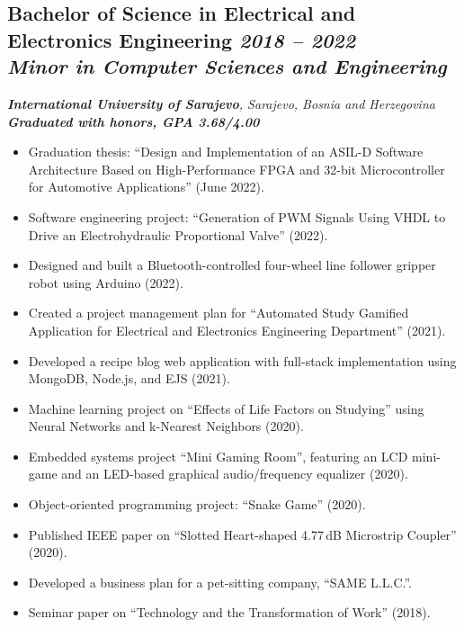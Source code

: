 \subsection*{\textbf{Bachelor of Science in Electrical and Electronics Engineering} \hfill \textit{2018 -- 2022}\\
\textit{Minor in Computer Sciences and Engineering}}  
\noindent\textit{\textbf{International University of Sarajevo}, Sarajevo, Bosnia and Herzegovina} \\  
\noindent\textit{\textbf{Graduated with honors, GPA 3.68/4.00}} 
\begin{itemize}[leftmargin=*,noitemsep,topsep=3pt]
    \item Graduation thesis: \enquote{Design and Implementation of an ASIL-D Software Architecture Based on High-Performance FPGA and 32-bit Microcontroller for Automotive Applications} (June 2022).
    \item Software engineering project: \enquote{Generation of PWM Signals Using VHDL to Drive an Electrohydraulic Proportional Valve} (2022).
    \item Designed and built a Bluetooth-controlled four-wheel line follower gripper robot using Arduino (2022).
    \item Created a project management plan for \enquote{Automated Study Gamified Application for Electrical and Electronics Engineering Department} (2021).
    \item Developed a recipe blog web application with full-stack implementation using MongoDB, Node.js, and EJS (2021).
    \item Machine learning project on \enquote{Effects of Life Factors on Studying} using Neural Networks and k-Nearest Neighbors (2020).
    \item Embedded systems project \enquote{Mini Gaming Room}, featuring an LCD mini-game and an LED-based graphical audio/frequency equalizer (2020).
    \item Object-oriented programming project: \enquote{Snake Game} (2020).
    \item Published IEEE paper on \enquote{Slotted Heart-shaped 4.77\,dB Microstrip Coupler} (2020).
    \item Developed a business plan for a pet-sitting company, \enquote{SAME L.L.C.}.
    \item Seminar paper on \enquote{Technology and the Transformation of Work} (2018).
\end{itemize}
\vspace{20pt}

